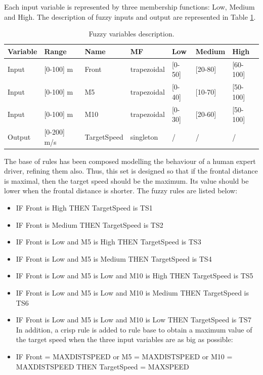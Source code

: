 \documentclass[runningheads,a4paper]{llncs}
\begin{document}
Each input variable is represented by three membership functions: Low, Medium and High. The description of fuzzy inputs and output are represented in Table \ref{tab:flouevar}.

\begin{table}
	\caption{Fuzzy variables description.}
	\label{tab:flouevar}
	\begin{tabular}{ |p{1.5cm}|p{2cm}|p{2cm}|p{2 cm}|p{1 cm}|p{1.5 cm}|p{1.5 cm}|}
		\hline
		{ \color{red} Variable }&
		{ \color{red} Range }&
		{ \color{red} Name}&  
		{ \color{red} MF } &
		{ \color{red} Low } &
		{ \color{red} Medium }&
		{ \color{red} High } 
		
		\\
		\hline
		\hline
		Input & [0-100] m & Front & trapezoidal & [0-50] & [20-80] & [60-100]
		\\
		\hline
		Input & [0-100] m & M5 & trapezoidal &[0-40] & [10-70] & [50-100] 
		\\
		\hline
		Input & [0-100] m  & M10 & trapezoidal & [0-30] & [20-60] & [50-100]
		\\
		\hline 
		Output & [0-200] m/s & TargetSpeed & singleton & / & / & /
		\\
		\hline 
	\end{tabular} 
\end{table}

The base of rules has been composed modelling the behaviour of a human expert driver, refining them also. Thus, this set is designed so that if the frontal distance is maximal, then the target speed should be the maximum. Its value should be lower when the frontal distance is shorter. 
The fuzzy rules are listed below:

\begin{itemize}
	\item IF Front is High THEN TargetSpeed is TS1
	\item IF Front is Medium THEN TargetSpeed is TS2
	\item IF Front is Low and M5 is High THEN TargetSpeed is TS3
	\item IF Front is Low and M5 is Medium THEN TargetSpeed is TS4
	\item IF Front is Low and M5 is Low and M10 is High THEN TargetSpeed is TS5
	\item IF Front is Low and M5 is Low and M10 is Medium THEN TargetSpeed is TS6
	\item IF Front is Low and M5 is Low and M10 is Low THEN TargetSpeed is TS7\\
	
	In addition, a crisp rule is added to rule base to obtain a maximum value of the target speed when the three input variables are as big as possible: 
	\item IF Front = MAXDISTSPEED or M5 = MAXDISTSPEED or M10 = MAXDISTSPEED THEN TargetSpeed = MAXSPEED		
\end{itemize}
\end{document}
